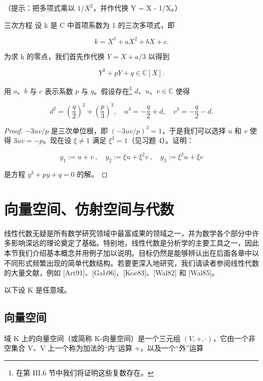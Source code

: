 \begin{exercises}
（提示：把多项式乘以 $ 1/X^{2} $，并作代换 Y = X - 1/X。）

\item

三次方程 设 k 是 C 中首项系数为 1 的三次多项式，即

\[
k=X^{3}+a X^{2}+b X+c.
\]

为求 k 的零点，我们首先作代换 $ Y = X + a/3 $ 以得到

\[
Y^{3}+p Y+q\in\mathbb{C}[X].
\]

用 $a$、$b$ 与 $c$ 表示系数 $p$ 与 $q$。假设存在\footnote{在第 III.6 节中我们将证明这些复数存在。} $d$、$u$、$v \in \mathbb{C}$ 使得

\begin{equation}
d^{2}=\left(\frac{q}{2}\right)^{2}+\left(\frac{p}{3}\right)^{3},\quad u^{3}=-\frac{q}{2}+d,\quad v^{3}=-\frac{q}{2}-d.
\end{equation}
\end{exercises}

\begin{proof}

$-3uv/p$ 是三次单位根，即 $(-3uv/p)^3 = 1$，于是我们可以选择 $u$ 和 $v$ 使得 $3uv = -p$。现在设 $\xi \neq 1$ 满足 $\xi^3 = 1$（见习题 4）。证明：

\[
y_{1}:=u+v~,\quad y_{2}:=\xi u+\xi^{2}v~,\quad y_{3}:=\xi^{2}u+\xi v
\]

是方程 $ y^{3} + py + q = 0 $ 的解。

\end{proof}

\section{向量空间、仿射空间与代数}

线性代数无疑是所有数学研究领域中最富成果的领域之一，并为数学各个部分中许多影响深远的理论奠定了基础。特别地，线性代数是分析学的主要工具之一，因此本节我们介绍基本概念并用例子加以说明。目标仍然是能够辨认出在后面各章中以不同形式频繁出现的简单代数结构。若要更深入地研究，我们请读者参阅线性代数的大量文献，例如 [Art91]、[Gab96]、[Koe83]、[Wal82] 和 [Wal85]。

以下设 K 是任意域。

\subsection*{向量空间}

域 K 上的向量空间（或简称 K-向量空间）是一个三元组  $ (V,+,\cdot) $，它由一个非空集合 V、V 上一个称为加法的“内”运算 +，以及一个“外”运算

